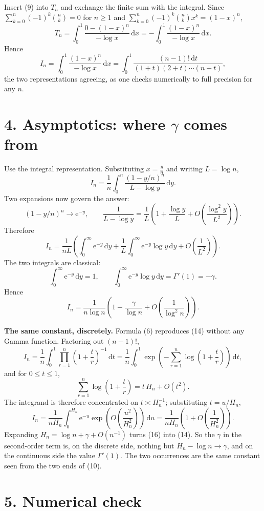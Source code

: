 \documentclass[12pt]{article}
\newcommand{\dd}{\,\mathrm{d}}
\newcommand{\e}{\mathrm{e}}
\newcommand{\Tn}{T_n}
\newcommand{\In}{I_n}
\newcommand{\Hh}{H}
\begin{document}
Insert (9) into \(\Tn\) and exchange the finite sum with the integral.
Since \(\sum_{k=0}^{n}(-1)^k\binom nk=0\) for \(n\ge1\) and
\(\sum_{k=0}^{n}(-1)^k\binom nk x^k=(1-x)^n\),
\[
\Tn=\int_0^1\frac{0-(1-x)^n}{-\log x}\dd x
=-\int_0^1\frac{(1-x)^n}{-\log x}\dd x .
\]
Hence
\[
\boxed{\displaystyle
\In=\int_0^1\frac{(1-x)^n}{-\log x}\dd x
=\int_0^1\frac{(n-1)!\dd t}{(1+t)(2+t)\cdots(n+t)} ,}
\tag{10}
\]
the two representations agreeing, as one checks numerically to full
precision for any \(n\).

\section*{4. Asymptotics: where \(\gamma\) comes from}

Use the integral representation. Substituting \(x=\frac yn\) and writing
\(L=\log n\),
\[
\In=\frac1n\int_0^n\frac{(1-y/n)^n}{L-\log y}\dd y .
\tag{11}
\]
Two expansions now govern the answer:
\[
(1-y/n)^n\longrightarrow\e^{-y},
\qquad
\frac1{L-\log y}=\frac1L\left(1+\frac{\log y}{L}
+O\!\left(\frac{\log^2 y}{L^2}\right)\right).
\tag{12}
\]
Therefore
\[
\In=\frac1{nL}\left(
\int_0^\infty \e^{-y}\dd y
+\frac1L\int_0^\infty \e^{-y}\log y\dd y
+O\!\left(\frac1{L^2}\right)\right).
\]
The two integrals are classical:
\[
\int_0^\infty \e^{-y}\dd y=1,
\qquad
\int_0^\infty \e^{-y}\log y\dd y=\Gamma'(1)=-\gamma .
\tag{13}
\]
Hence
\[
\boxed{\displaystyle
\In=\frac1{n\log n}\left(1-\frac{\gamma}{\log n}
+O\!\left(\frac1{\log^2 n}\right)\right).}
\tag{14}
\]

\textbf{The same constant, discretely.} Formula (6) reproduces (14)
without any Gamma function. Factoring out \((n-1)!\),
\[
\In=\frac1n\int_0^1\prod_{r=1}^{n}\left(1+\frac tr\right)^{-1}\dd t
=\frac1n\int_0^1\exp\left(-\sum_{r=1}^{n}\log\left(1+\frac tr\right)\right)\dd t,
\tag{15}
\]
and for \(0\le t\le1\),
\[
\sum_{r=1}^{n}\log\left(1+\frac tr\right)=t\,\Hh_n+O(t^2).
\]
The integrand is therefore concentrated on \(t\asymp \Hh_n^{-1}\);
substituting \(t=u/\Hh_n\),
\[
\In=\frac1{n\Hh_n}\int_0^{\Hh_n}\e^{-u}
\exp\!\left(O\!\left(\frac{u^2}{\Hh_n^2}\right)\right)\dd u
=\frac1{n\Hh_n}\left(1+O\!\left(\frac1{\Hh_n^{2}}\right)\right).
\tag{16}
\]
Expanding \(\Hh_n=\log n+\gamma+O(n^{-1})\) turns (16) into (14). So the
\(\gamma\) in the second-order term is, on the discrete side, nothing but
\(\Hh_n-\log n\to\gamma\), and on the continuous side the value
\(\Gamma'(1)\). The two occurrences are the same constant seen from the
two ends of (10).

\section*{5. Numerical check}
\end{document}

